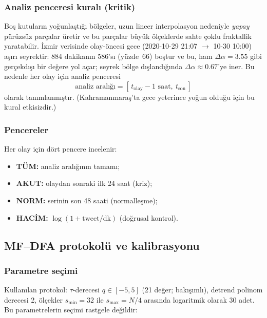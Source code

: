 \documentclass[11pt,a4paper]{article}
\newcommand{\Dal}{\Delta\alpha}
\begin{document}
\subsubsection{Analiz penceresi kuralı (kritik)}
Boş kutuların yoğunlaştığı bölgeler, uzun lineer interpolasyon nedeniyle
\emph{yapay} pürüzsüz parçalar üretir ve bu parçalar büyük ölçeklerde sahte
çoklu fraktallik yaratabilir. İzmir verisinde olay-öncesi gece
(2020-10-29 21:07 $\to$ 10-30 10:00) aşırı seyrektir: 884 dakikanın 586'sı
(yüzde~66) boştur ve bu, ham $\Dal=3.55$ gibi gerçekdışı bir değere yol açar;
seyrek bölge dışlandığında $\Dal \approx 0.67$'ye iner. Bu nedenle her olay
için analiz penceresi
\begin{equation}
  \text{analiz aralığı} = [\,t_{\text{olay}} - 1\text{ saat},\ t_{\text{son}}\,]
\end{equation}
olarak tanımlanmıştır. (Kahramanmaraş'ta gece yeterince yoğun olduğu için bu
kural etkisizdir.)

\subsubsection{Pencereler}
Her olay için dört pencere incelenir:
\begin{itemize}[leftmargin=1.4em]
  \item \textbf{TÜM:} analiz aralığının tamamı;
  \item \textbf{AKUT:} olaydan sonraki ilk 24 saat (kriz);
  \item \textbf{NORM:} serinin son 48 saati (normalleşme);
  \item \textbf{HACİM:} $\log(1+\text{tweet/dk})$ (doğrusal kontrol).
\end{itemize}

\subsection{MF--DFA protokolü ve kalibrasyonu}

\subsubsection{Parametre seçimi}
Kullanılan protokol: $\tau$-derecesi $q \in [-5, 5]$ (21 değer; bakışımlı),
detrend polinom derecesi 2, ölçekler $s_{\min}=32$ ile $s_{\max}=N/4$
arasında logaritmik olarak 30 adet. Bu parametrelerin seçimi rastgele değildir:
\end{document}
